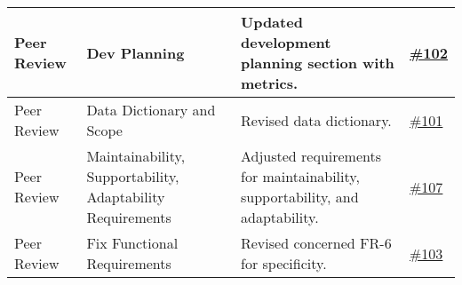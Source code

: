 \documentclass{article}
\begin{document}
\begin{longtable}{| p{} | p{} | p{} | p{} |}
    \hline
    Peer Review & Dev Planning & Updated development planning section with metrics. & \href{https://github.com/TPGEngine/tpg/issues/102}{\#102} \\
    \hline
    Peer Review & Data Dictionary and Scope & Revised data dictionary. & \href{https://github.com/TPGEngine/tpg/issues/101}{\#101} \\
    \hline
    Peer Review & Maintainability, Supportability, Adaptability Requirements & Adjusted requirements for maintainability, supportability, and adaptability. & \href{https://github.com/TPGEngine/tpg/issues/107}{\#107} \\
    \hline
    Peer Review & Fix Functional Requirements & Revised concerned FR-6 for specificity. & \href{https://github.com/TPGEngine/tpg/issues/103}{\#103} \\
    \hline
\end{longtable}
\end{document}
